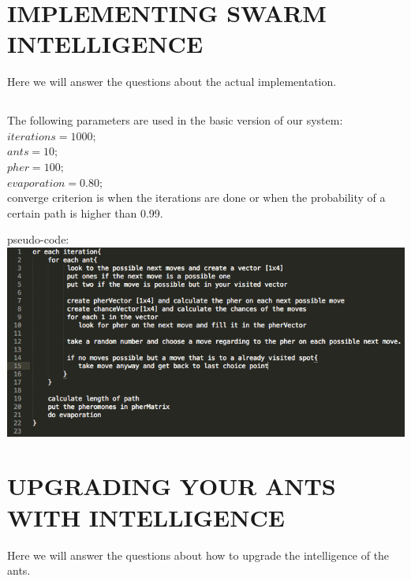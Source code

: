 \documentclass{scrartcl}
\begin{document}
 \section{IMPLEMENTING SWARM INTELLIGENCE}
 Here we will answer the questions about the actual implementation.
 
 \subsection{}
 The following parameters are used in the basic version of our system:\\
 $ iterations = 1000; $\\
 $ ants = 10; $ \\
 $ pher = 100; $\\
 $ evaporation = 0.80; $\\
converge criterion is when the iterations are done or when the probability of a certain path is higher than 0.99. \\
\pagebreak

pseudo-code:\\
\includegraphics[width=1\textwidth]{pseudo.PNG}

\pagebreak
\section{UPGRADING YOUR ANTS WITH INTELLIGENCE}
Here we will answer the questions about how to upgrade the intelligence of the ants.
\end{document}

